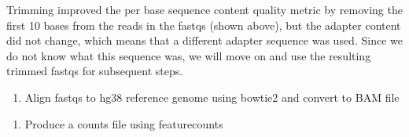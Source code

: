 \documentclass[
]{article}
\newenvironment{Shaded}{\begin{snugshade}}{\end{snugshade}}
\newcommand{\AttributeTok}[1]{\textcolor[rgb]{0.77,0.63,0.00}{#1}}
\newcommand{\CommentTok}[1]{\textcolor[rgb]{0.56,0.35,0.01}{\textit{#1}}}
\newcommand{\ExtensionTok}[1]{#1}
\newcommand{\NormalTok}[1]{#1}
\newcommand{\OperatorTok}[1]{\textcolor[rgb]{0.81,0.36,0.00}{\textbf{#1}}}
\newcommand{\VariableTok}[1]{\textcolor[rgb]{0.00,0.00,0.00}{#1}}
\providecommand{\tightlist}{%
  \setlength{\itemsep}{0pt}\setlength{\parskip}{0pt}}
\begin{document}
Trimming improved the per base sequence content quality metric by
removing the first 10 bases from the reads in the fastqs (shown above),
but the adapter content did not change, which means that a different
adapter sequence was used. Since we do not know what this sequence was,
we will move on and use the resulting trimmed fastqs for subsequent
steps.

\begin{enumerate}
\def\labelenumi{\arabic{enumi}.}
\setcounter{enumi}{2}
\tightlist
\item
  Align fastqs to hg38 reference genome using bowtie2 and convert to BAM
  file
\end{enumerate}

\begin{Shaded}
\end{Shaded}

\begin{enumerate}
\def\labelenumi{\arabic{enumi}.}
\setcounter{enumi}{3}
\tightlist
\item
  Produce a counts file using featurecounts
\end{enumerate}
\end{document}
